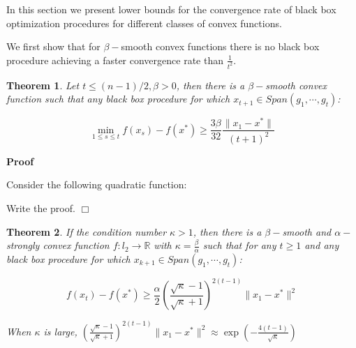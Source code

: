 \documentclass{article}
\newtheorem{theorem}{Theorem}
\newcommand{\proofstart}{{\bf Proof\hspace{2em}}}
\newcommand{\proofend}{\hspace*{\fill}\mbox{$\Box$}}
\begin{document}
In this section we present lower bounds for the convergence rate of black box optimization procedures for different classes of convex functions. 

We first show that for $\beta-$smooth convex functions there is no black box procedure achieving a faster convergence rate than $\frac{1}{t^2}$. 



\begin{theorem}
Let $t \leq (n-1)/2 , \beta >0$, then there is a $\beta-$smooth convex function such that any black box procedure for which $x_{t+1} \in Span(g_1, \cdots, g_t)$: 

\begin{equation}
\min_{1 \leq s \leq t } f(x_s ) - f(x^*) \geq \frac{3\beta}{32} \frac{\parallel x_1 - x^*\parallel}{(t+1)^2}
\end{equation}

\end{theorem}




\proofstart


Consider the following quadratic function:



Write the proof. 
\proofend


\begin{theorem}
If the condition number $\kappa > 1$, then there is a $\beta-$smooth and $\alpha-$strongly convex function $f: l_2 \rightarrow \mathbb{R}$ with $\kappa = \frac{\beta}{\alpha}$ such that for any $t \geq 1$ and any black box procedure for which $x_{k+1} \in Span( g_1, \cdots, g_t)$:

\begin{equation}
f(x_t) - f(x^*) \geq \frac{\alpha}{2} \left(\frac{ \sqrt{\kappa}-1}{\sqrt{\kappa}+1}\right)^{2(t-1)} \parallel x_1 - x^* \parallel^2
\end{equation}

When $\kappa$ is large, $\left(\frac{ \sqrt{\kappa}-1}{\sqrt{\kappa}+1}\right)^{2(t-1)} \parallel x_1 - x^* \parallel^2 \approx \exp( -\frac{4(t-1)}{\sqrt{\kappa}})$


\end{theorem}
\end{document}
